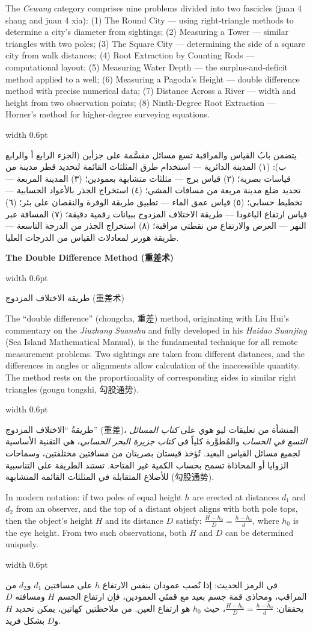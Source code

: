 \documentclass[11pt,a4paper]{article}
\newlength{\cnwidth}
\newlength{\arwidth}
\newcommand{\paralleltext}[2]{%
  \par\medskip\noindent
  \begin{minipage}[t]{\cnwidth}%
    \small #1%
  \end{minipage}%
  \hfill\textcolor{colrule}{\vrule width 0.6pt}\hfill
  \begin{minipage}[t]{\arwidth}%
    \small\arabicfont\beginR #2\endR%
  \end{minipage}%
  \par\medskip
}
\newcommand{\parallelsubsection}[2]{%
  \par\medskip\noindent
  \begin{minipage}[t]{\cnwidth}%
    \large\bfseries\color{sectioncolor} #1%
  \end{minipage}%
  \hfill\textcolor{colrule}{\vrule width 0.6pt}\hfill
  \begin{minipage}[t]{\arwidth}%
    \large\arabicfontbf\color{sectioncolor}\beginR #2\endR%
  \end{minipage}%
  \par\smallskip
}
\begin{document}
\paralleltext{%
The \textit{Cewang} category comprises nine problems divided into two fascicles (juan 4 shang and juan 4 xia): (1) The Round City --- using right-triangle methods to determine a city's diameter from sightings; (2) Measuring a Tower --- similar triangles with two poles; (3) The Square City --- determining the side of a square city from walk distances; (4) Root Extraction by Counting Rods --- computational layout; (5) Measuring Water Depth --- the surplus-and-deficit method applied to a well; (6) Measuring a Pagoda's Height --- double difference method with precise numerical data; (7) Distance Across a River --- width and height from two observation points; (8) Ninth-Degree Root Extraction --- Horner's method for higher-degree surveying equations.
}{%
يتضمن بابُ القياس والمراقبة تسع مسائل مقسَّمة على جزأين (الجزء الرابع أ والرابع ب): (١) المدينة الدائرية --- استخدام طرق المثلثات القائمة لتحديد قطر مدينة من قياسات بصرية؛ (٢) قياس برج --- مثلثات متشابهة بعمودين؛ (٣) المدينة المربعة --- تحديد ضلع مدينة مربعة من مسافات المشي؛ (٤) استخراج الجذر بالأعواد الحسابية --- تخطيط حسابي؛ (٥) قياس عمق الماء --- تطبيق طريقة الوفرة والنقصان على بئر؛ (٦) قياس ارتفاع الباغودا --- طريقة الاختلاف المزدوج ببيانات رقمية دقيقة؛ (٧) المسافة عبر النهر --- العرض والارتفاع من نقطتي مراقبة؛ (٨) استخراج الجذر من الدرجة التاسعة --- طريقة هورنر لمعادلات القياس من الدرجات العليا.
}

\parallelsubsection{The Double Difference Method (重差术)}{طريقة الاختلاف المزدوج (重差术)}

\paralleltext{%
The ``double difference'' (chongcha, 重差) method, originating with Liu Hui's commentary on the \textit{Jiuzhang Suanshu} and fully developed in his \textit{Haidao Suanjing} (Sea Island Mathematical Manual), is the fundamental technique for all remote measurement problems. Two sightings are taken from different distances, and the differences in angles or alignments allow calculation of the inaccessible quantity. The method rests on the proportionality of corresponding sides in similar right triangles (gougu tongshi, 勾股通势).
}{%
طريقةُ ``الاختلاف المزدوج'' (重差)، المنشأة من تعليقات ليو هوي على \textit{كتاب المسائل التسع في الحساب} والمُطوَّرة كلياً في \textit{كتاب جزيرة البحر الحسابي}، هي التقنية الأساسية لجميع مسائل القياس البعيد. تُؤخذ قيستان بصريتان من مسافتين مختلفتين، وسماحات الزوايا أو المحاذاة تسمح بحساب الكمية غير المتاحة. تستند الطريقة على التناسبية للأضلاع المتقابلة في المثلثات القائمة المتشابهة (勾股通势).
}

\paralleltext{%
In modern notation: if two poles of equal height $h$ are erected at distances $d_1$ and $d_2$ from an observer, and the top of a distant object aligns with both pole tops, then the object's height $H$ and its distance $D$ satisfy: $\frac{H - h_0}{D} = \frac{h - h_0}{d}$, where $h_0$ is the eye height. From two such observations, both $H$ and $D$ can be determined uniquely.
}{%
في الرمز الحديث: إذا نُصب عمودان بنفس الارتفاع $h$ على مسافتين $d_1$ و$d_2$ من المراقب، ومحاذى قمة جسم بعيد مع قمتَي العمودين، فإن ارتفاع الجسم $H$ ومسافته $D$ يحققان: $\frac{H - h_0}{D} = \frac{h - h_0}{d}$، حيث $h_0$ هو ارتفاع العين. من ملاحظتين كهاتين، يمكن تحديد $H$ و$D$ بشكل فريد.
}
\end{document}
